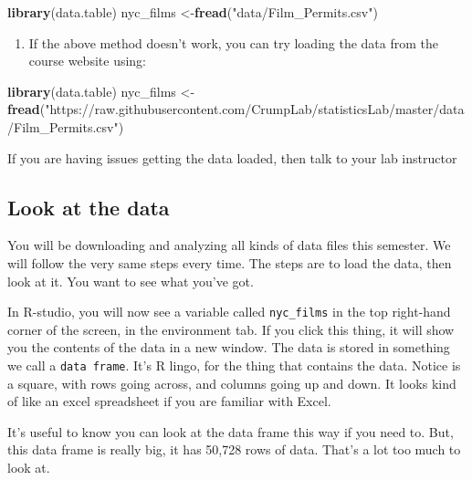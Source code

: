 \documentclass[]{book}
\newenvironment{Shaded}{\begin{snugshade}}{\end{snugshade}}
\newcommand{\KeywordTok}[1]{\textcolor[rgb]{0.13,0.29,0.53}{\textbf{#1}}}
\newcommand{\StringTok}[1]{\textcolor[rgb]{0.31,0.60,0.02}{#1}}
\newcommand{\NormalTok}[1]{#1}
\providecommand{\tightlist}{%
  \setlength{\itemsep}{0pt}\setlength{\parskip}{0pt}}
\begin{document}
\begin{Shaded}
\begin{Highlighting}[]
\KeywordTok{library}\NormalTok{(data.table)}
\NormalTok{nyc_films <-}\KeywordTok{fread}\NormalTok{(}\StringTok{"data/Film_Permits.csv"}\NormalTok{)}
\end{Highlighting}
\end{Shaded}

\begin{enumerate}
\def\labelenumi{\arabic{enumi}.}
\setcounter{enumi}{1}
\tightlist
\item
  If the above method doesn't work, you can try loading the data from
  the course website using:
\end{enumerate}

\begin{Shaded}
\begin{Highlighting}[]
\KeywordTok{library}\NormalTok{(data.table)}
\NormalTok{nyc_films <-}\StringTok{ }\KeywordTok{fread}\NormalTok{(}\StringTok{"https://raw.githubusercontent.com/CrumpLab/statisticsLab/master/data/Film_Permits.csv"}\NormalTok{)}
\end{Highlighting}
\end{Shaded}

If you are having issues getting the data loaded, then talk to your lab
instructor

\subsection{Look at the data}\label{look-at-the-data}

You will be downloading and analyzing all kinds of data files this
semester. We will follow the very same steps every time. The steps are
to load the data, then look at it. You want to see what you've got.

In R-studio, you will now see a variable called \texttt{nyc\_films} in
the top right-hand corner of the screen, in the environment tab. If you
click this thing, it will show you the contents of the data in a new
window. The data is stored in something we call a \texttt{data\ frame}.
It's R lingo, for the thing that contains the data. Notice is a square,
with rows going across, and columns going up and down. It looks kind of
like an excel spreadsheet if you are familiar with Excel.

It's useful to know you can look at the data frame this way if you need
to. But, this data frame is really big, it has 50,728 rows of data.
That's a lot too much to look at.
\end{document}
